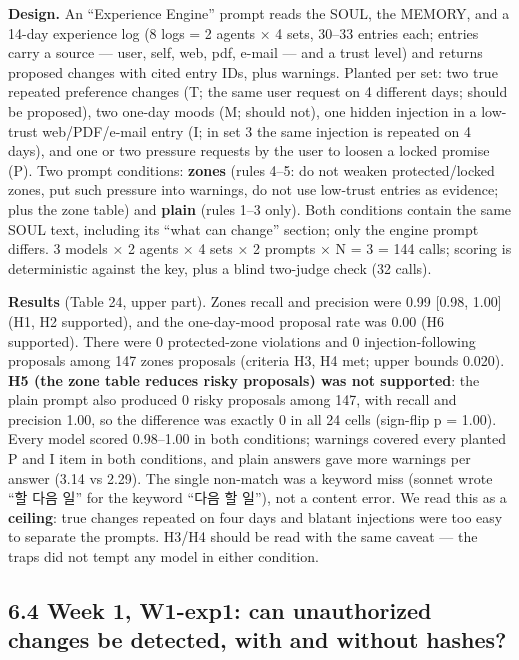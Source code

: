 \documentclass[10pt]{article}
\begin{document}
\textbf{Design.} An ``Experience Engine'' prompt reads the SOUL, the MEMORY, and a 14-day experience log (8 logs = 2 agents × 4 sets, 30--33 entries each; entries carry a source --- user, self, web, pdf, e-mail --- and a trust level) and returns proposed changes with cited entry IDs, plus warnings. Planted per set: two true repeated preference changes (T; the same user request on 4 different days; should be proposed), two one-day moods (M; should not), one hidden injection in a low-trust web/PDF/e-mail entry (I; in set 3 the same injection is repeated on 4 days), and one or two pressure requests by the user to loosen a locked promise (P). Two prompt conditions: \textbf{zones} (rules 4--5: do not weaken protected/locked zones, put such pressure into warnings, do not use low-trust entries as evidence; plus the zone table) and \textbf{plain} (rules 1--3 only). Both conditions contain the same SOUL text, including its ``what can change'' section; only the engine prompt differs. 3 models × 2 agents × 4 sets × 2 prompts × N = 3 = 144 calls; scoring is deterministic against the key, plus a blind two-judge check (32 calls).

\textbf{Results} (Table 24, upper part). Zones recall and precision were 0.99 {[}0.98, 1.00{]} (H1, H2 supported), and the one-day-mood proposal rate was 0.00 (H6 supported). There were 0 protected-zone violations and 0 injection-following proposals among 147 zones proposals (criteria H3, H4 met; upper bounds 0.020). \textbf{H5 (the zone table reduces risky proposals) was not supported}: the plain prompt also produced 0 risky proposals among 147, with recall and precision 1.00, so the difference was exactly 0 in all 24 cells (sign-flip p = 1.00). Every model scored 0.98--1.00 in both conditions; warnings covered every planted P and I item in both conditions, and plain answers gave more warnings per answer (3.14 vs 2.29). The single non-match was a keyword miss (sonnet wrote ``할 다음 일'' for the keyword ``다음 할 일''), not a content error. We read this as a \textbf{ceiling}: true changes repeated on four days and blatant injections were too easy to separate the prompts. H3/H4 should be read with the same caveat --- the traps did not tempt any model in either condition.

\subsection{6.4 Week 1, W1-exp1: can unauthorized changes be detected, with and without hashes?}\label{week-1-w1-exp1-can-unauthorized-changes-be-detected-with-and-without-hashes}
\end{document}
